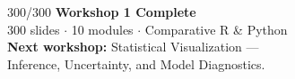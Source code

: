 \documentclass[10pt]{beamer}
\newcommand{\smark}[1]{\hfill{\scriptsize\color{codegray}#1}}
\begin{document}
\begin{frame}{}
\smark{300/300}
\centering\vspace{1.5cm}
{\Huge\textbf{Workshop 1 Complete}}\\[0.8cm]
{\Large 300 slides $\cdot$ 10 modules $\cdot$ Comparative R \& Python}\\[0.8cm]
\textbf{Next workshop:} Statistical Visualization ---\\Inference, Uncertainty, and Model Diagnostics.
\end{frame}
\end{document}
